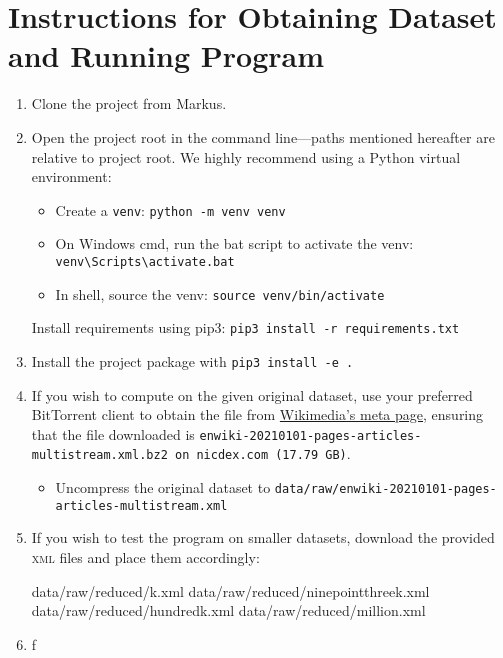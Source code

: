 \documentclass[fontsize=12pt]{article}
\newcommand{\py}[1]{\texttt{#1}}
\begin{document}
\section{Instructions for Obtaining Dataset and Running Program}
\begin{enumerate}
    \item Clone the project from Markus.
    \item Open the project root in the command line---paths mentioned hereafter are relative to project root. We highly recommend using a Python virtual environment: \begin{itemize}
        \item Create a \py{venv}: \py{python -m venv venv}
        \item On Windows cmd, run the bat script to activate the venv: \texttt{venv\textbackslash Scripts\textbackslash activate.bat}
        \item In shell, source the venv: \texttt{source venv/bin/activate}
    \end{itemize}
     Install requirements using pip3: \texttt{pip3 install -r requirements.txt}
    \item Install the project package with \py{pip3 install -e .}
    \item If you wish to compute on the given original dataset, use your preferred BitTorrent client to obtain the file from \href{https://meta.wikimedia.org/wiki/Data_dump_torrents#English_Wikipedia}{Wikimedia's meta page}, ensuring that the file downloaded is \texttt{enwiki-20210101-pages-articles-multistream.xml.bz2 on nicdex.com (17.79 GB)}. \begin{itemize}
        \item Uncompress the original dataset to \texttt{data/raw/enwiki-20210101-pages-articles-multistream.xml}
    \end{itemize}
    \item If you wish to test the program on smaller datasets, download the provided \textsc{xml} files and place them accordingly: \begin{verbatim*}
data/raw/reduced/k.xml
data/raw/reduced/ninepointthreek.xml
data/raw/reduced/hundredk.xml
data/raw/reduced/million.xml
\end{verbatim*}
    \item f
    
\end{enumerate}
\end{document}
